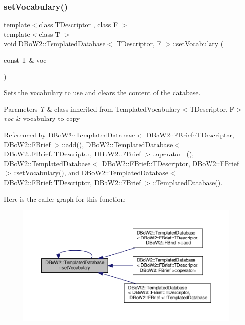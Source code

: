 \subsubsection{\texorpdfstring{set\+Vocabulary()}{setVocabulary()}\hspace{0.1cm}{\footnotesize\ttfamily [1/2]}}
{\footnotesize\ttfamily template$<$class T\+Descriptor , class F $>$ \\
template$<$class T $>$ \\
void \hyperlink{classDBoW2_1_1TemplatedDatabase}{D\+Bo\+W2\+::\+Templated\+Database}$<$ T\+Descriptor, F $>$\+::set\+Vocabulary (\begin{DoxyParamCaption}\item[{const T \&}]{voc }\end{DoxyParamCaption})\hspace{0.3cm}{\ttfamily [inline]}}

Sets the vocabulary to use and clears the content of the database. 
\begin{DoxyParams}{Parameters}
{\em T} & class inherited from Templated\+Vocabulary$<$\+T\+Descriptor, F$>$ \\
\hline
{\em voc} & vocabulary to copy \\
\hline
\end{DoxyParams}


Referenced by D\+Bo\+W2\+::\+Templated\+Database$<$ D\+Bo\+W2\+::\+F\+Brief\+::\+T\+Descriptor, D\+Bo\+W2\+::\+F\+Brief $>$\+::add(), D\+Bo\+W2\+::\+Templated\+Database$<$ D\+Bo\+W2\+::\+F\+Brief\+::\+T\+Descriptor, D\+Bo\+W2\+::\+F\+Brief $>$\+::operator=(), D\+Bo\+W2\+::\+Templated\+Database$<$ D\+Bo\+W2\+::\+F\+Brief\+::\+T\+Descriptor, D\+Bo\+W2\+::\+F\+Brief $>$\+::set\+Vocabulary(), and D\+Bo\+W2\+::\+Templated\+Database$<$ D\+Bo\+W2\+::\+F\+Brief\+::\+T\+Descriptor, D\+Bo\+W2\+::\+F\+Brief $>$\+::\+Templated\+Database().

Here is the caller graph for this function\+:\nopagebreak
\begin{figure}[H]
\begin{center}
\leavevmode
\includegraphics[width=350pt]{classDBoW2_1_1TemplatedDatabase_a7d282bfdd4a6883b282fc71d0fd5dcb4_icgraph}
\end{center}
\end{figure}
\mbox{\label{classDBoW2_1_1TemplatedDatabase_aaf1d0ecfdab16ff0609386e2638e76b6}} 
